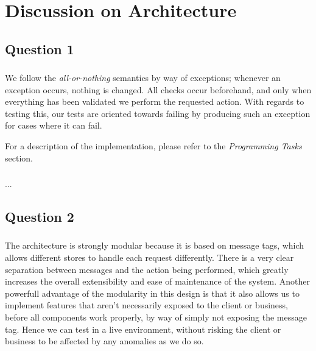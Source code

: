 
\section{Discussion on Architecture}

\subsection{Question 1}

\subsubsection{}
We follow the {\it all-or-nothing} semantics by way of exceptions; whenever an
exception occurs, nothing is changed. All checks occur beforehand, and only when
everything has been validated we perform the requested action. With regards to
testing this, our tests are oriented towards failing by producing such an
exception for cases where it can fail.

For a description of the implementation, please refer to the {\it Programming
Tasks} section.

\subsubsection{}
...

\subsection{Question 2}

\subsubsection{}
The architecture is strongly modular because it is based on message tags, which
allows different stores to handle each request differently. There is a very
clear separation between messages and the action being performed, which greatly
increases the overall extensibility and ease of maintenance of the system.
Another powerfull advantage of the modularity in this design is that it also
allows us to implement features that aren't necessarily exposed to the client or
business, before all components work properly, by way of simply not exposing the
message tag. Hence we can test in a live environment, without risking the client
or business to be affected by any anomalies as we do so.


